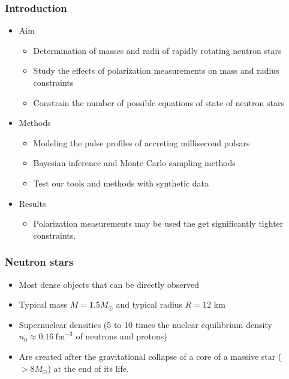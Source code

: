 \documentclass{beamer}
\begin{document}
\begin{frame}
\frametitle{Introduction}
\begin{itemize}
\item Aim
\begin{itemize}
\item Determination of masses and radii of rapidly rotating neutron stars 
\item Study the effects of polarization measurements on mass and radius constraints
\item Constrain the number of possible equations of state of neutron stars
\end{itemize}
\item Methods
\begin{itemize}
\item Modeling the pulse profiles of accreting millisecond pulsars
\item Bayesian inference and Monte Carlo sampling methods
\item Test our tools and methods with synthetic data
\end{itemize}
\item Results
\begin{itemize}
\item Polarization measurements may be used the get
significantly tighter constraints. 
\end{itemize}
\end{itemize}
\end{frame}




\begin{frame}
\frametitle{Neutron stars}
\begin{itemize}
\item Most dense objects that can be directly observed
\item Typical mass $M = 1.5 M_{\odot}$ and typical radius $R =  12$ km
\item Supernuclear densities (5 to 10 times the nuclear equilibrium density $n_{0} \approx 0.16 ~\mathrm{fm}^{-3}$ of neutrons and protons)
\item Are created after the gravitational collapse of a core of a
massive star ($> 8 M_{\odot}$) at the end of its life.
\end{itemize}
\end{frame}
\end{document}
